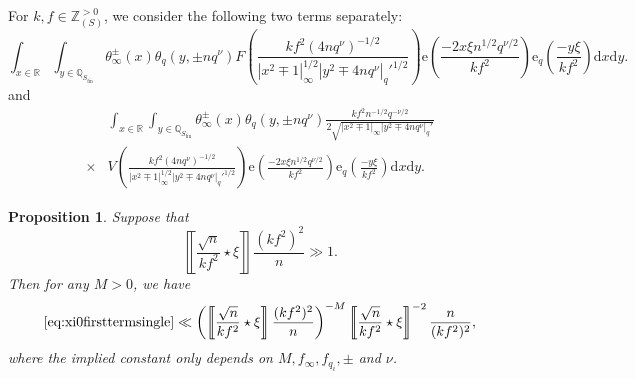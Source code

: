 \documentclass[10pt,oneside,reqno]{amsart}
\newcommand\rmd{\mathrm{d}}
\newcommand\rme{\mathrm{e}}
\newcommand\QQ{\mathbb{Q}}
\newcommand\RR{\mathbb{R}}
\newcommand\ZZ{\mathbb{Z}}
\newcommand\fin{\mathrm{fin}}
\newcommand\legendresymbol[2]{\genfrac{(}{)}{}{}{#1}{#2}}
\theoremstyle{THEOREM}
\newtheorem{proposition}[theorem]{Proposition}
\theoremstyle{DEFINITION}
\theoremstyle{EXERCISE}
\numberwithin{equation}{section}
\begin{document}
For $k,f\in \ZZ_{(S)}^{>0}$, we consider the following two terms separately:
\begin{equation}\label{eq:xi0firsttermsingle}
\int_{x\in\RR}\int_{y\in\QQ_{S_\fin}}\!\theta_\infty^\pm(x)\theta_{q}(y,\pm nq^\nu) F\legendresymbol{kf^2(4nq^\nu)^{-1/2}}{|x^2\mp 1|_\infty^{1/2}|y^2\mp 4nq^\nu|_q'^{1/2}} \rme\legendresymbol{-2x\xi n^{1/2}q^{\nu/2}}{kf^2}\rme_{q}\!\legendresymbol{-y\xi}{kf^2}\!\rmd x\rmd y.
\end{equation}
and
\begin{equation}\label{eq:xi0secondtermid}
\begin{split}
   & \int_{x\in\RR}\int_{y\in\QQ_{S_\fin}}\theta_\infty^\pm(x)\theta_{q}(y,\pm nq^\nu)\frac{kf^2n^{-1/2}q^{-\nu/2}}{2\sqrt{|x^2\mp 1|_\infty|y^2\mp 4nq^\nu|_q'}} \\ \times&V\legendresymbol{kf^2(4nq^\nu)^{-1/2}}{|x^2\mp 1|_\infty^{1/2}|y^2\mp 4nq^\nu|_q'^{1/2}}\rme\legendresymbol{-2x\xi n^{1/2}q^{\nu/2}}{kf^2}\rme_{q}\legendresymbol{-y\xi}{kf^2}\rmd x\rmd y.
\end{split}
\end{equation}

\begin{proposition}\label{prop:xi0firstterm1}
Suppose that 
\[
\left\llbracket\frac{\sqrt{n}}{kf^2}\star \xi\right\rrbracket\frac {(kf^2)^2}{n} \gg 1.
\]
Then for any $M>0$, we have
\[
\eqref{eq:xi0firsttermsingle}
\ll \left(\left\llbracket\frac{\sqrt{n}}{kf^2}\star \xi\right\rrbracket\frac {(kf^2)^2}{n}\right)^{-M}\left\llbracket\frac{\sqrt{n}}{kf^2}\star \xi\right\rrbracket^{-2}\frac{n}{(kf^2)^2},
\]
where the implied constant only depends on $M,f_\infty,f_{q_i},\pm$ and $\nu$.
\end{proposition}
\end{document}
